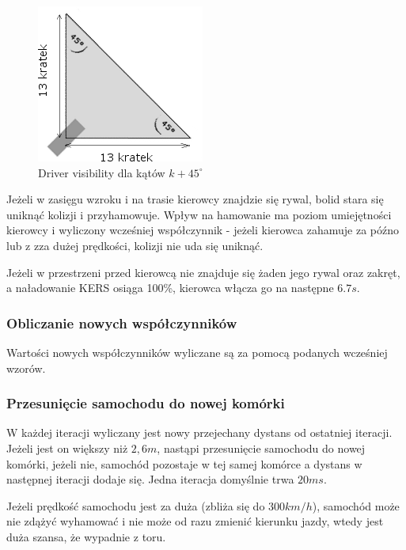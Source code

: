 \documentclass{article}
\begin{document}
\begin{figure}[h]
\begin{center}
\includegraphics[scale=0.6]{visibility-top-left.png}
\caption{Driver visibility dla kątów $k+45^{\circ}$}
\end{center}
\end{figure}

Jeżeli w zasięgu wzroku i na trasie kierowcy znajdzie się rywal, bolid stara się uniknąć kolizji i przyhamowuje. Wpływ na hamowanie ma poziom umiejętności kierowcy i wyliczony wcześniej współczynnik - jeżeli kierowca zahamuje za późno lub z zza dużej prędkości, kolizji nie uda się uniknąć.

Jeżeli w przestrzeni przed kierowcą nie znajduje się żaden jego rywal oraz zakręt, a naładowanie KERS osiąga 100\%, kierowca włącza go na następne $6.7 s$.



\subsubsection{Obliczanie nowych współczynników}

Wartości nowych współczynników wyliczane są za pomocą podanych wcześniej wzorów.

\subsubsection{Przesunięcie samochodu do nowej komórki}
W każdej iteracji wyliczany jest nowy przejechany dystans od ostatniej iteracji. Jeżeli jest on większy niż $2,6 m$, nastąpi przesunięcie samochodu do nowej komórki, jeżeli nie, samochód pozostaje w tej samej komórce a dystans w następnej iteracji dodaje się. Jedna iteracja domyślnie trwa $20 ms$.

Jeżeli prędkość samochodu jest za duża (zbliża się do $300 km/h$), samochód może nie zdążyć wyhamować i nie może od razu zmienić kierunku jazdy, wtedy jest duża szansa, że wypadnie z toru.
\end{document}
